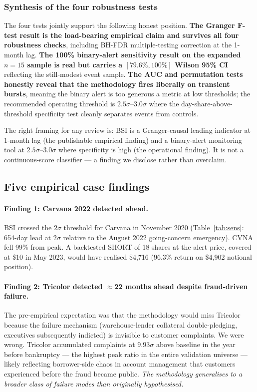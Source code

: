 \documentclass[11pt,a4paper]{article}
\begin{document}
\subsubsection{Synthesis of the four robustness tests}

The four tests jointly support the following honest position. \textbf{The Granger F-test result is the load-bearing empirical claim and survives all four robustness checks}, including BH-FDR multiple-testing correction at the 1-month lag. \textbf{The 100\% binary-alert sensitivity result on the expanded $n=15$ sample is real but carries a $[79.6\%, 100\%]$ Wilson 95\% CI} reflecting the still-modest event sample. \textbf{The AUC and permutation tests honestly reveal that the methodology fires liberally on transient bursts}, meaning the binary alert is too generous a metric at low thresholds; the recommended operating threshold is $2.5\sigma$--$3.0\sigma$ where the day-share-above-threshold specificity test cleanly separates events from controls.

The right framing for any review is: BSI is a Granger-causal leading indicator at 1-month lag (the publishable empirical finding) and a binary-alert monitoring tool at $2.5\sigma$--$3.0\sigma$ where specificity is high (the operational finding). It is not a continuous-score classifier --- a finding we disclose rather than overclaim.

\subsection{Five empirical case findings}\label{sec:results_cases}

\paragraph{Finding 1: Carvana 2022 detected ahead.} BSI crossed the $2\sigma$ threshold for Carvana in November 2020 (Table~\ref{tab:sens}: 654-day lead at $2\sigma$ relative to the August 2022 going-concern emergency). CVNA fell 99\% from peak. A backtested SHORT of 18 shares at the alert price, covered at \$10 in May 2023, would have realised \$4{,}716 (96.3\% return on \$4{,}902 notional position).

\paragraph{Finding 2: Tricolor detected $\approx$22 months ahead despite fraud-driven failure.} The pre-empirical expectation was that the methodology would miss Tricolor because the failure mechanism (warehouse-lender collateral double-pledging, executives subsequently indicted) is invisible to customer complaints. We were wrong. Tricolor accumulated complaints at $9.93\sigma$ above baseline in the year before bankruptcy --- the highest peak ratio in the entire validation universe --- likely reflecting borrower-side chaos in account management that customers experienced before the fraud became public. \emph{The methodology generalises to a broader class of failure modes than originally hypothesised.}
\end{document}
